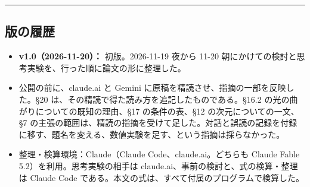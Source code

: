 \documentclass[
  a4paper,
]{ltjsarticle}
\providecommand{\tightlist}{%
  \setlength{\itemsep}{0pt}\setlength{\parskip}{0pt}}
\begin{document}
\begin{center}\rule{0.5\linewidth}{0.5pt}\end{center}

\subsection{版の履歴}\label{ux7248ux306eux5c65ux6b74}

\begin{itemize}
\tightlist
\item
  \textbf{v1.0（2026-11-20）：} 初版。2026-11-19 夜から 11-20
  朝にかけての検討と思考実験を、行った順に論文の形に整理した。
\item
  公開の前に、claude.ai と Gemini
  に原稿を精読させ、指摘の一部を反映した。§20
  は、その精読で得た読み方を追記したものである。§16.2
  の光の曲がりについての既知の理由、§17 の条件の表、§12
  の次元についての一文、§7
  の主張の範囲は、精読の指摘を受けて足した。対話と誤読の記録を付録に移す、題名を変える、数値実験を足す、という指摘は採らなかった。
\item
  整理・検算環境：Claude（Claude Code、claude.ai。どちらも Claude Fable
  5.2）を利用。思考実験の相手は
  claude.ai、事前の検討と、式の検算・整理は Claude Code
  である。本文の式は、すべて付属のプログラムで検算した。
\end{itemize}
\end{document}
